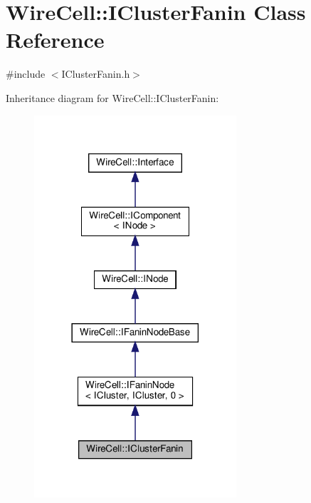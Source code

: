 \hypertarget{class_wire_cell_1_1_i_cluster_fanin}{}\section{Wire\+Cell\+:\+:I\+Cluster\+Fanin Class Reference}
\label{class_wire_cell_1_1_i_cluster_fanin}


{\ttfamily \#include $<$I\+Cluster\+Fanin.\+h$>$}



Inheritance diagram for Wire\+Cell\+:\+:I\+Cluster\+Fanin\+:
\nopagebreak
\begin{figure}[H]
\begin{center}
\leavevmode
\includegraphics[width=213pt]{class_wire_cell_1_1_i_cluster_fanin__inherit__graph}
\end{center}
\end{figure}


